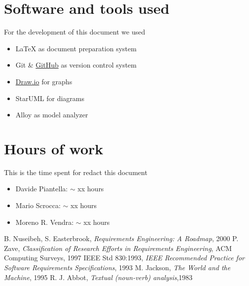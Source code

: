 \begin{appendices}
	\section{Software and tools used}
	For the development of this document we used
	\begin{itemize}
		\item \LaTeX{} as document preparation system
		\item Git \& \href{http://github.com}{GitHub} as version control system
		\item \href{http://draw.io}{Draw.io} for graphs
		\item StarUML for diagrams
		\item Alloy as model analyzer
	\end{itemize}
	
	\section{Hours of work}
	This is the time spent for redact this document
	\begin{itemize}
		\item Davide Piantella: $\sim$ xx hours
		\item Mario Scrocca: $\sim$ xx hours
		\item Moreno R. Vendra: $\sim$ xx hours
	\end{itemize}
\end{appendices}
\clearpage
\begin{thebibliography}{9}
B. Nuseibeh, S. Easterbrook, \emph{Requirements Engineering: A Roadmap}, 2000
P. Zave, \emph{Classification of Research Efforts in Requirements
Engineering}, ACM Computing Surveys, 1997
IEEE Std 830:1993, \emph{IEEE Recommended Practice for Software Requirements Specifications}, 1993
M. Jackson, \emph{The World and the Machine}, 1995
R. J. Abbot, \emph{Textual (noun-verb) analysis},1983
\end{thebibliography}